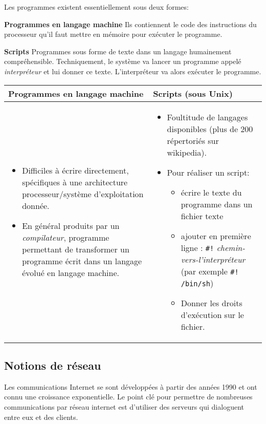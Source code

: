 \begin{prop}
Les programmes existent essentiellement sous deux formes:

\item \textbf{Programmes en langage machine} Ils contiennent le code des
  instructions du processeur qu'il faut mettre en mémoire pour
  exécuter le programme.
\item \textbf{Scripts} Programmes sous forme de texte dans un langage
  humainement compréhensible. Techniquement, le système va lancer un
  programme appelé \emph{interpréteur} et lui donner ce
  texte. L'interpréteur va alors exécuter le programme.
\end{prop}

\begin{center}
\begin{tabular}{|p{}|p{}|}
\hline
\textbf{Programmes en langage machine}& \textbf{Scripts (sous Unix)}\\
\hline
\begin{itemize}
\item Difficiles à écrire directement, spécifiques à une architecture
  processeur/système d'exploitation donnée.
\item En général produits par un \emph{compilateur}, programme
  permettant de transformer un programme écrit dans un langage évolué
  en langage machine.
\end{itemize}
&
\begin{itemize}
\item Foultitude de langages disponibles (plus de 200 répertoriés sur
  wikipedia).
\item Pour réaliser un script:
  \begin{itemize}
  \item écrire le texte du programme dans un fichier texte
  \item ajouter en première ligne :
    \verb+#!+ \emph{chemin-vers-l'interpréteur}
    (par exemple \verb+#! /bin/sh+)
  \item Donner les droits d'exécution sur le fichier.
  \end{itemize}
\end{itemize}
\\
\hline
\end{tabular}
\end{center}



\subsection{Notions de réseau}
Les communications Internet se sont développées à partir des années 1990 et ont connu une croissance exponentielle. Le point clé pour permettre de nombreuses communications par réseau internet est d’utiliser des serveurs qui dialoguent entre eux et des clients.
